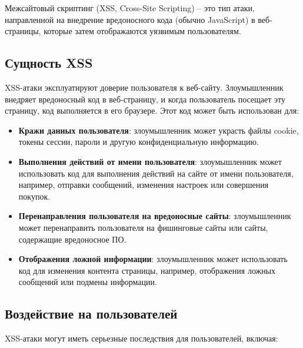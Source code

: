 \documentclass[a4paper,12pt]{diplom}
\begin{document}
	 Межсайтовый скриптинг (XSS, Cross-Site Scripting) – это тип атаки, направленной на внедрение вредоносного кода (обычно JavaScript) в веб-страницы, которые затем отображаются уязвимым пользователям. 
	 
	 \subsection{Сущность XSS}
	 
	 XSS-атаки эксплуатируют доверие пользователя к веб-сайту. Злоумышленник внедряет вредоносный код в веб-страницу, и когда пользователь посещает эту страницу, код выполняется в его браузере. Этот код может быть использован для:
	 
	 \begin{itemize}
	 	\item \textbf{Кражи данных пользователя}: злоумышленник может украсть файлы cookie, токены сессии, пароли и другую конфиденциальную информацию.
	 	\item \textbf{Выполнения действий от имени пользователя}: злоумышленник может использовать код для выполнения действий на сайте от имени пользователя, например, отправки сообщений, изменения настроек или совершения покупок.
	 	\item \textbf{Перенаправления пользователя на вредоносные сайты}: злоумышленник может перенаправить пользователя на фишинговые сайты или сайты, содержащие вредоносное ПО.
	 	\item \textbf{Отображения ложной информации}: злоумышленник может использовать код для изменения контента страницы, например, отображения ложных сообщений или подмены информации. 
	 \end{itemize}
	 
	 \subsection{Воздействие на пользователей}
	 
	 XSS-атаки могут иметь серьезные последствия для пользователей, включая:
	 
\end{document}
